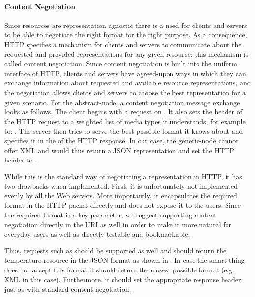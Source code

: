 \paragraph{Content Negotiation}
Since resources are representation agnostic there is a need for clients and servers to be able to negotiate the right format for the right purpose. As a consequence, HTTP specifies a mechanism for clients and servers to communicate about the requested and provided representations for any given resource; this mechanism is called content negotiation. Since content negotiation is built into the uniform interface of HTTP, clients and servers have agreed-upon ways in which they can exchange information about requested and available resource representations, and
the negotiation allows clients and servers to choose the best representation for a given scenario.
For the abstract-node, a content negotiation message exchange looks as follows. The client begins with a  request on
.
It also sets the  header of the HTTP request to a weighted list of media types it understands, for example to: . The server then tries to serve the best possible format it knows about and specifies
it in the  of the HTTP response. In our case, the generic-node cannot offer XML and would thus return a JSON representation and set the HTTP header to .

While this is the standard way of negotiating a representation in HTTP, it has two drawbacks when implemented. First, it is unfortunately not implemented evenly by all the Web servers. More importantly, it encapsulates the required format in the HTTP packet directly and does not expose it to the users.  Since the required format is a key parameter, we suggest supporting content negotiation directly in the URI as well in order to make it more natural for everyday users as well as directly testable and bookmarkable. 

Thus, requests such as  should be supported as well and should return the temperature resource in the JSON format as shown in . In case the smart thing does not accept this format it should return the closest possible format (e.g., XML in this case). Furthermore, it should set the appropriate response header:  just as with standard content negotiation. 

